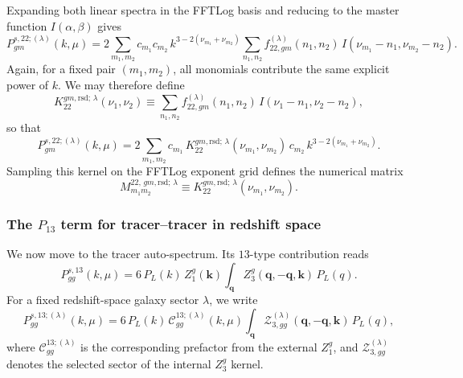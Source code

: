 \documentclass[a4paper,11pt]{article}
\newcommand{\vk}{\bm{k}}
\newcommand{\vq}{\bm{q}}
\newcommand{\<}{\langle}
\renewcommand{\>}{\rangle}
\begin{document}
Expanding both linear spectra in the FFTLog basis and reducing to the master function \(I(\alpha,\beta)\) gives
\begin{equation}
P_{gm}^{s,22;(\lambda)}(k,\mu)
=
2\sum_{m_1,m_2} c_{m_1}c_{m_2}\,
k^{3-2(\nu_{m_1}+\nu_{m_2})}
\sum_{n_1,n_2}
f_{22,gm}^{(\lambda)}(n_1,n_2)\,
I(\nu_{m_1}-n_1,\nu_{m_2}-n_2).
\label{eq:P22_gm_after_master}
\end{equation}
Again, for a fixed pair \((m_1,m_2)\), all monomials contribute the same explicit power of \(k\). We may therefore define
\begin{equation}
K_{22}^{gm,\mathrm{rsd};\,\lambda}(\nu_1,\nu_2)
\equiv
\sum_{n_1,n_2}
f_{22,gm}^{(\lambda)}(n_1,n_2)\,
I(\nu_1-n_1,\nu_2-n_2),
\label{eq:K22_gm_lambda}
\end{equation}
so that
\begin{equation}
P_{gm}^{s,22;(\lambda)}(k,\mu)
=
2\sum_{m_1,m_2}
c_{m_1}\,
K_{22}^{gm,\mathrm{rsd};\,\lambda}(\nu_{m_1},\nu_{m_2})\,
c_{m_2}\,
k^{3-2(\nu_{m_1}+\nu_{m_2})}.
\label{eq:P22_gm_kernel_form}
\end{equation}
Sampling this kernel on the FFTLog exponent grid defines the numerical matrix
\begin{equation}
M_{m_1m_2}^{22,\,gm,\mathrm{rsd};\,\lambda}
\equiv
K_{22}^{gm,\mathrm{rsd};\,\lambda}(\nu_{m_1},\nu_{m_2}).
\end{equation}

\subsubsection{The \(P_{13}\) term for tracer--tracer in redshift space}

We now move to the tracer auto-spectrum. Its \(13\)-type contribution reads
\begin{equation}
P_{gg}^{s,13}(k,\mu)
=
6\,P_L(k)\,Z_1^g(\vk)
\int_{\vq} Z_3^g(\vq,-\vq,\vk)\,P_L(q).
\label{eq:P13_gg_start}
\end{equation}
For a fixed redshift-space galaxy sector \(\lambda\), we write
\begin{equation}
P_{gg}^{s,13;(\lambda)}(k,\mu)
=
6\,P_L(k)\,\mathcal C_{gg}^{13;(\lambda)}(k,\mu)
\int_{\vq}
\mathcal Z_{3,gg}^{(\lambda)}(\vq,-\vq,\vk)\,
P_L(q),
\label{eq:P13_gg_lambda_start}
\end{equation}
where \(\mathcal C_{gg}^{13;(\lambda)}\) is the corresponding prefactor from the external \(Z_1^g\), and \(\mathcal Z_{3,gg}^{(\lambda)}\) denotes the selected sector of the internal \(Z_3^g\) kernel.
\end{document}
